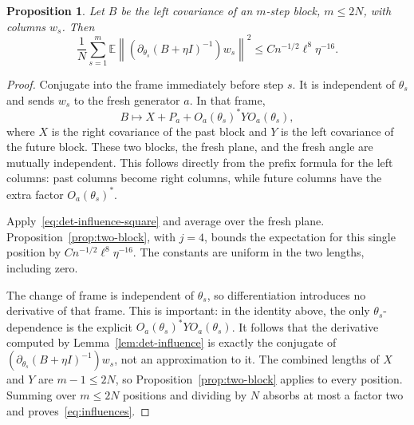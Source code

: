 \documentclass[11pt]{article}
\newtheorem{proposition}[theorem]{Proposition}
\theoremstyle{definition}\newtheorem{definition}[theorem]{Definition}
\theoremstyle{remark}\newtheorem{remark}[theorem]{Remark}
\newcommand{\E}{\mathbb E}
\newcommand{\norm}[1]{\left\lVert#1\right\rVert}
\begin{document}
\begin{proposition}\label{prop:influences}
Let $B$ be the left covariance of an $m$-step block, $m\le2N$, with columns $w_s$. Then
\begin{equation}\label{eq:influences}
 \frac1N\sum_{s=1}^m
 \E\norm{\left(\partial_{\theta_s}(B+\eta I)^{-1}\right)w_s}^2
 \le C n^{-1/2}\ell^8\eta^{-16}.
\end{equation}
\end{proposition}
\begin{proof}
Conjugate into the frame immediately before step $s$. It is independent of $\theta_s$ and sends $w_s$ to the fresh generator $a$. In that frame,
\[
 B\longmapsto X+P_a+O_a(\theta_s)^*YO_a(\theta_s),
\]
where $X$ is the right covariance of the past block and $Y$ is the left covariance of the future block. These two blocks, the fresh plane, and the fresh angle are mutually independent. This follows directly from the prefix formula for the left columns: past columns become right columns, while future columns have the extra factor $O_a(\theta_s)^*$.

Apply~\eqref{eq:det-influence-square} and average over the fresh plane. Proposition~\ref{prop:two-block}, with $j=4$, bounds the expectation for this single position by $C n^{-1/2}\ell^8\eta^{-16}$. The constants are uniform in the two lengths, including zero.

The change of frame is independent of $\theta_s$, so differentiation introduces no derivative of that frame. This is important: in the identity above, the only $\theta_s$-dependence is the explicit $O_a(\theta_s)^*YO_a(\theta_s)$. It follows that the derivative computed by Lemma~\ref{lem:det-influence} is exactly the conjugate of $(\partial_{\theta_s}(B+\eta I)^{-1})w_s$, not an approximation to it. The combined lengths of $X$ and $Y$ are $m-1\le2N$, so Proposition~\ref{prop:two-block} applies to every position.
 Summing over $m\le2N$ positions and dividing by $N$ absorbs at most a factor two and proves~\eqref{eq:influences}.
\end{proof}
\end{document}
